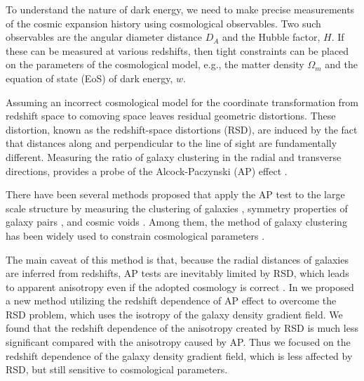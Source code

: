 \documentclass[useAMS,usenatbib]{mn2e}
\begin{document}
To understand the nature of dark energy, 
we need to make precise measurements of the cosmic expansion history using cosmological observables. 
Two such observables are the angular diameter distance $D_A$ and the Hubble factor, $H$. 
If these can be measured at various redshifts, then tight constraints can be placed on the parameters of the cosmological model,
e.g., the matter density $\Omega_m$ and the equation of state (EoS) of dark energy, $w$.

Assuming an incorrect cosmological model for the coordinate transformation from redshift space to comoving space leaves residual geometric distortions. 
These distortion, known as the redshift-space distortions (RSD), are induced by the fact that distances along and perpendicular to the line of sight are fundamentally different.
Measuring the ratio of galaxy clustering in the radial and transverse directions, provides a probe of the Alcock-Paczynski (AP) effect \citep{AP1979}.

There have been several methods proposed that apply the AP test to the large scale structure
by measuring the clustering of galaxies \citep{Ballinger1996,Matsubara1996},
symmetry properties of galaxy pairs \citep{Marinoni2010,Jennings2011,BB2012}, 
and cosmic voids \citep{Ryden1995,LavausWandelt1995,Sutter2014}.
Among them, the method of galaxy clustering has been widely used to constrain cosmological parameters 
\citep{Outram2004,Blake2011,ChuangWang2012,Reid2012,Beutler2013,Linder2013,2014arXiv1407.2257S, Jeong2014,2014ApJ...781...96L}. 


The main caveat of this method is that, because the radial distances of galaxies are inferred from redshifts, 
AP tests are inevitably limited by RSD,
which leads to apparent anisotropy even if the adopted cosmology is correct \citep{Ballinger1996}.
In \cite{Li2014} we proposed a new method utilizing the redshift dependence of AP effect to overcome the RSD problem, 
which uses the isotropy of the galaxy density gradient field. 
We found that the redshift dependence of the anisotropy created by RSD is much less significant compared with the anisotropy caused by AP.
Thus we focused on the redshift dependence of the galaxy density gradient field,
which is less affected by RSD, but still sensitive to cosmological parameters.
\end{document}
